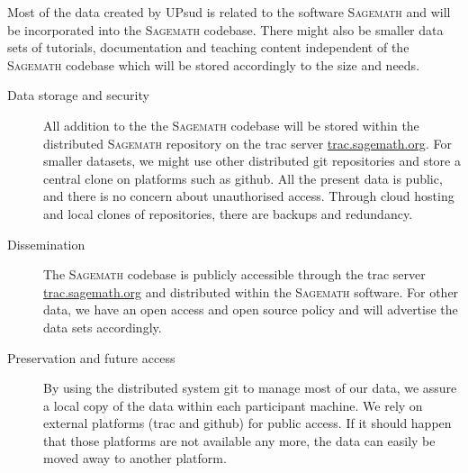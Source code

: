 \documentclass[12pt]{article}
\newcommand{\software}[1]{\textsc{#1}\xspace}
\newcommand{\Sage}{\software{Sagemath}}
\begin{document}
Most of the data created by UPsud is related to the software \Sage and will be incorporated into the \Sage codebase. There might also be smaller data sets of tutorials, documentation and teaching content independent of the \Sage codebase which will be stored accordingly to the size and needs.
\begin{description}
\item[Data storage and security] All addition to the the \Sage codebase will be stored within the distributed \Sage repository on the trac server \href{http://trac.sagemath.org/}{trac.sagemath.org}. For smaller datasets, we might use other distributed git repositories and store a central clone on platforms such as github. All the present data is public, and there is no concern about
unauthorised access. Through cloud hosting and local clones of
repositories, there are backups and redundancy.
\item[Dissemination] The \Sage codebase is publicly accessible through the trac server \href{http://trac.sagemath.org/}{trac.sagemath.org} and distributed within the \Sage software. For other data, we have an open access and open source policy and will advertise the data sets accordingly.
\item[Preservation and future access] By using the distributed system git to manage most of our data, we assure a local copy of the data within each participant machine. We rely on external platforms (trac and github) for public access. If it should happen that those platforms are not available any more, the data can easily be moved away to another platform.
\end{description}
\end{document}
